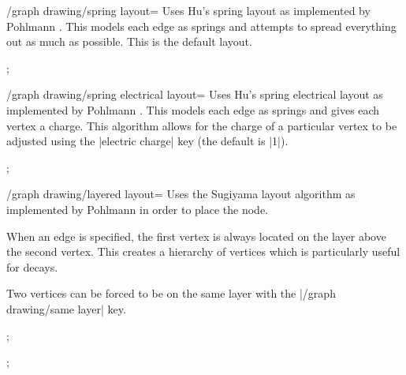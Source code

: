 \documentclass[a4paper,final]{ltxdoc}
\begin{document}
\begin{key}{/graph drawing/spring layout=}
  Uses Hu's spring layout \cite{hu2005} as implemented by Pohlmann \cite{pohlmann2011}.  This models each edge as springs and attempts to spread everything out as much as possible.  This is the default layout.

\begin{codeexample}[]
;
\end{codeexample}
\end{key}

\begin{key}{/graph drawing/spring electrical layout=}
  Uses Hu's spring electrical layout \cite{hu2005} as implemented by Pohlmann \cite{pohlmann2011}.  This models each edge as springs and gives each vertex a charge.  This algorithm allows for the charge of a particular vertex to be adjusted using the |electric charge| key (the default is |1|).

\begin{codeexample}[]
;
\end{codeexample}
\end{key}

\begin{key}{/graph drawing/layered layout=}
  Uses the Sugiyama layout algorithm \cite{eades1991} as implemented by Pohlmann \cite{pohlmann2011} in order to place the node.

  When an edge is specified, the first vertex is always located on the layer above the second vertex.  This creates a hierarchy of vertices which is particularly useful for decays.

  Two vertices can be forced to be on the same layer with the |/graph drawing/same layer| key.

\begin{codeexample}[]
;
\end{codeexample}
\begin{codeexample}[]
;
\end{codeexample}
\end{key}
\end{document}
